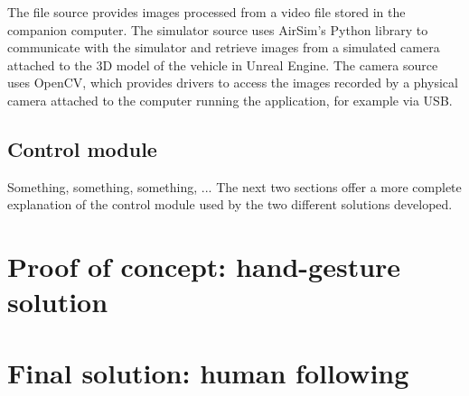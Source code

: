 The file source provides images processed from a video file stored in the companion computer.
The simulator source uses AirSim's Python library to communicate with the simulator and retrieve images from a simulated camera attached to the 3D model of the vehicle in Unreal Engine.
The camera source uses OpenCV, which provides drivers to access the images recorded by a physical camera attached to the computer running the application, for example via USB.

\subsection{Control module}
Something, something, something, ... The next two sections offer a more complete explanation of the control module used by the two different solutions developed.



\section{Proof of concept: hand-gesture solution}

\section{Final solution: human following}



\cleardoublepage